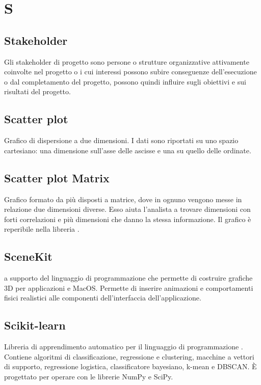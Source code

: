 \section*{S}
\markright{}

\subsection*{Stakeholder}
Gli stakeholder di progetto sono persone o strutture organizzative attivamente coinvolte nel progetto o i cui interessi possono subire conseguenze dell’esecuzione o dal completamento del progetto, possono quindi influire sugli obiettivi e sui risultati del progetto.

\subsection*{Scatter plot}
Grafico di dispersione a due dimensioni. I dati sono riportati su uno spazio cartesiano: una dimensione sull'asse delle ascisse e una su quello delle ordinate. 

\subsection*{Scatter plot Matrix}
Grafico formato da più  disposti a matrice, dove in ognuno vengono messe in relazione due dimensioni diverse. Esso aiuta l'analista a trovare dimensioni con forti correlazioni e più  dimensioni che danno la stessa informazione. Il grafico è reperibile nella libreria .

\subsection*{SceneKit}
 a supporto del linguaggio di programmazione  che permette di costruire grafiche 3D per applicazioni  e MacOS. Permette di inserire animazioni e comportamenti fisici realistici alle componenti dell'interfaccia dell'applicazione. 

\subsection*{Scikit-learn}
Libreria  di apprendimento automatico per il linguaggio di programmazione . Contiene algoritmi di classificazione, regressione e clustering, macchine a vettori di supporto, regressione logistica, classificatore bayesiano, k-mean e DBSCAN. È progettato per operare con le librerie NumPy e SciPy. 

